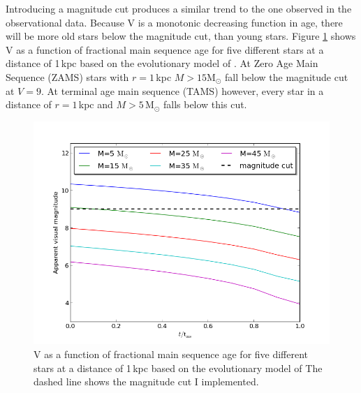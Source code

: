 \documentclass[a4paper,10pt]{article}
\begin{document}
 Introducing a magnitude cut produces a similar trend to the one observed in the observational data. Because V is a monotonic decreasing
 function in age, there will be more old stars below the magnitude cut, than young stars. Figure \ref{magage} shows
 V as a function of fractional main sequence age for five different stars at a distance of 1$\,$kpc based on the evolutionary model of 
 \citet{2000MNRAS.315..543H}. At Zero Age Main Sequence (ZAMS) stars with $r=1\,$kpc $M>15\mathrm{M}_\odot$ fall below the magnitude cut at 
 $V=9$. At terminal age main sequence (TAMS) however, every star in a distance of $r=1\,$kpc and $M>5\,$M$_\odot$ falls below this cut.\\
 \begin{figure}
  \includegraphics[width=\textwidth]{magage}
  \caption{V as a function of fractional main sequence age for five different stars at a distance of 1$\,$kpc based on the evolutionary model 
  of \citet{2000MNRAS.315..543H} The dashed line shows the magnitude cut I implemented.\label{magage}}
 \end{figure}
\end{document}
